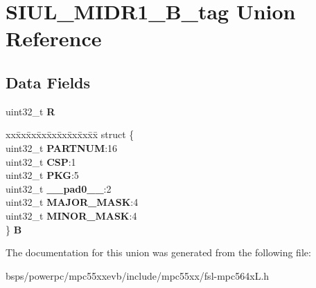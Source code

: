 \hypertarget{unionSIUL__MIDR1__32B__tag}{}\section{S\+I\+U\+L\+\_\+\+M\+I\+D\+R1\+\_\+B\+\_\+tag Union Reference}
\label{unionSIUL__MIDR1__32B__tag}
\subsection*{Data Fields}
\begin{DoxyCompactItemize}
\item 
\mbox{\label{unionSIUL__MIDR1__32B__tag_accd9f4b2f213ae12b4768f7b381f1515}} 
uint32\+\_\+t {\bfseries R}
\item 
\mbox{\label{unionSIUL__MIDR1__32B__tag_ab639fb301bbec28ee2f66330723a6f4c}} 
\begin{tabbing}
xx\=xx\=xx\=xx\=xx\=xx\=xx\=xx\=xx\=\kill
struct \{\\
\>uint32\_t {\bfseries PARTNUM}:16\\
\>uint32\_t {\bfseries CSP}:1\\
\>uint32\_t {\bfseries PKG}:5\\
\>uint32\_t {\bfseries \_\_pad0\_\_}:2\\
\>uint32\_t {\bfseries MAJOR\_MASK}:4\\
\>uint32\_t {\bfseries MINOR\_MASK}:4\\
\} {\bfseries B}\\

\end{tabbing}\end{DoxyCompactItemize}


The documentation for this union was generated from the following file\+:\begin{DoxyCompactItemize}
\item 
bsps/powerpc/mpc55xxevb/include/mpc55xx/fsl-\/mpc564x\+L.\+h\end{DoxyCompactItemize}
